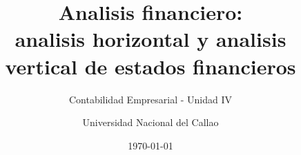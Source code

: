 \newcommand{\barraVertical}{%
\begin{tikzpicture}[x=0.045cm,y=0.7cm,font=\tiny]
  \draw[fill=orange!25, draw=BloqueNaranja] (0,0) rectangle (61.86,1);
  \draw[fill=green!25, draw=BloqueVerde] (61.86,0) rectangle (100,1);
  \node at (31,0.5) {Costo 61.86\%};
  \node at (81,0.5) {Bruta 38.14\%};
  \draw (0,-0.25) -- (100,-0.25);
  \node[below] at (0,-0.25) {0\%};
  \node[below] at (100,-0.25) {100\% ventas};
\end{tikzpicture}}

\newcommand{\cuadroComparativoTikz}{%
\begin{tikzpicture}[font=\tiny, scale=0.88, transform shape]
  \node[draw=BloqueVerde, fill=green!8, rounded corners=2pt, align=center, minimum width=2.5cm, minimum height=1.7cm] (h) at (0,0) {Horizontal\\Tiempo\\Tendencia};
  \node[draw=BloqueNaranja, fill=orange!10, rounded corners=2pt, align=center, minimum width=2.5cm, minimum height=1.7cm] (v) at (3.4,0) {Vertical\\Estructura\\Peso};
  \node[draw=BloqueMorado, fill=purple!8, rounded corners=2pt, align=center, minimum width=2.7cm] (d) at (1.7,-1.65) {Decision\\mejor informada};
  \draw[-{Latex[length=2mm]}, thick, gray] (h) -- (d);
  \draw[-{Latex[length=2mm]}, thick, gray] (v) -- (d);
\end{tikzpicture}}

\title[Analisis financiero]{Analisis financiero:\\analisis horizontal y analisis vertical de estados financieros}
\subtitle{Contabilidad Empresarial - Unidad IV}
\author{Universidad Nacional del Callao}
\date{\today}
